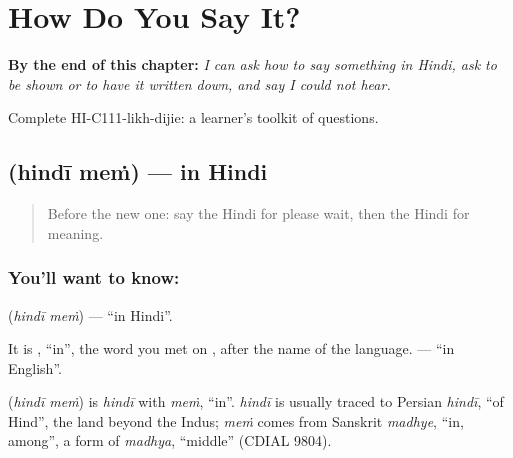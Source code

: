 
\chapter{How Do You Say It?}
\label{ch:hi-how-do-you-say-it}

\begin{chapteropening}
\textbf{By the end of this chapter:} \emph{I can ask how to say something in Hindi, ask to be shown or to have it written down, and say I could not hear.}

Complete HI-C111-likh-dijie: a learner's toolkit of questions.
\end{chapteropening}

\section[\texorpdfstring{\hi{हिंदी} \hi{में} (hindī meṁ)}{हिंदी में (hindī meṁ)}]{  (hindī meṁ) — in Hindi}

\label{lesson:HI-C111-hindime}



\begin{quote}
Before the new one: say the Hindi for please wait, then the Hindi for meaning.
\end{quote}

\subsection*{You'll want to know:  }
\textbf{ } (\emph{hindī meṁ}) — \textquotedblleft{}in Hindi\textquotedblright{}.

It is \textbf{}, \textquotedblleft{}in\textquotedblright{}, the word you met on \textbf{}, after the name of the language. \textbf{ } — \textquotedblleft{}in English\textquotedblright{}.

\begin{cousinweb}
\textbf{ } (\emph{hindī meṁ}) is \emph{hindī} with \emph{meṁ}, \textquotedblleft{}in\textquotedblright{}. \emph{hindī} is usually traced to Persian \emph{hindī}, \textquotedblleft{}of Hind\textquotedblright{}, the land beyond the Indus; \emph{meṁ} comes from Sanskrit \emph{madhye}, \textquotedblleft{}in, among\textquotedblright{}, a form of \emph{madhya}, \textquotedblleft{}middle\textquotedblright{} (CDIAL 9804).
\end{cousinweb}

